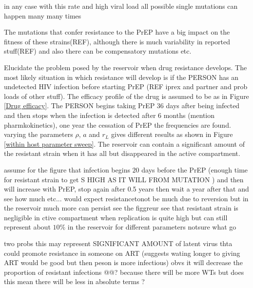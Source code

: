 \documentclass[DIV=15]{scrartcl}
\begin{document}
in any case with this rate  and high viral load all possible single mutations can happen many many times~\cite{coffin1995}

The mutations that confer resistance to the PrEP have a big impact on the fitness of these strains(REF), although there is much variability in reported stuff(REF) and also there can be compensatory mutations etc.


Elucidate the problem posed by the reservoir when drug resistance develops. The  most likely situation in which resistance will develop is  if  the PERSON has an undetected HIV infection before starting PrEP (REF iprex and partner and prob loads of  other stuff). The efficacy profile of the drug is assumed to be as in Figure \ref{Drug efficacy}. The PERSON begins taking PrEP $36$ days after being infected and then stops when the infection is detected after $6$ months (mention pharmkokinetics), one year the cessation  of PrEP the frequencies are found. varying the parameters $\rho$, $a$ and $r_L$ 
gives different results as shown in Figure \ref{within host parameter sweep}. The reservoir can contain a significant amount of the resistant strain when it has all   but disappeared in the active compartment.

assume for the figure that infection begins 
$20$ days before the PrEP (enough time for resistant strain to get S HIGH AS IT WILL  FROM MUTATION 	)  and then will  increase with PrEP, stop again  after 0.5  years then wait a year after that and see how much etc...      would expect resistancetonot be much due to  reversion but in the reservoir much more can persist see the figgreur
see that resistant strain is negligible in ctive compartment when replication  is quite high but can still  represent about $10\%$ in the reservoir for different parameters notsure  what go 

two  probs this may represent  SIGNIFICANT AMOUNT 	of latent virus thta could promote resistance in someone on ART (suggests wating longer to giving ART would be good but then peson is  more  infectious) obvs it will  decrease the proportion of resistant infections @@? because there will be more  WTs  but does  this mean there will be less in absolute terms ?




\end{document}
